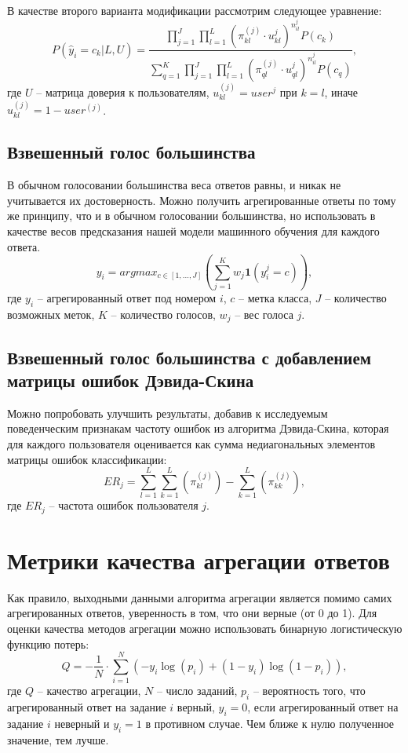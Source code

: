 \documentclass[specification,annotation,times]{itmo-student-thesis}
\begin{document}
В качестве второго варианта модификации рассмотрим следующее уравнение:
\[P(\hat{y}_{i}=c_{k}|L, U)=\frac{\prod_{j=1}^{J}\prod_{l=1}^{L}(\pi^{(j)}_{kl}\cdot u_{kl}^{j})^{n_{il}^{j}}P(c_{k})}{\sum_{q=1}^{K}\prod_{j=1}^{J}\prod_{l=1}^{L}(\pi^{(j)}_{ql}\cdot u_{ql}^{j})^{n_{il}^{j}}P(c_{q})},\]
где $U$ -- матрица доверия к пользователям, $u_{kl}^{(j)} = user^{j}$ при $k=l$, иначе $u_{kl}^{(j)} = 1 - user^{(j)}$.

\subsection{Взвешенный голос большинства}
В обычном голосовании большинства веса ответов равны, и никак не учитывается их достоверность. Можно получить агрегированные ответы по тому же принципу, что и в обычном голосовании большинства, но использовать в качестве весов предсказания нашей модели машинного обучения для каждого ответа.
\[y_{i}=argmax_{c\in[1,\dots,J]}(\sum_{j=1}^{K}w_{j}\mathbf{1}(y_{i}^{j}=c)),\]
где $y_{i}$ -- агрегированный ответ под номером $i$, $c$ -- метка класса, $J$ -- количество возможных меток, $K$ -- количество голосов, $w_{j}$ -- вес голоса $j$.

\subsection{Взвешенный голос большинства с добавлением матрицы ошибок Дэвида-Скина}
Можно попробовать улучшить результаты, добавив к исследуемым поведенческим признакам частоту ошибок из алгоритма Дэвида-Скина, которая для каждого пользователя оценивается как сумма недиагональных элементов матрицы ошибок классификации:
\[ER_{j}=\sum_{l=1}^{L}\sum_{k=1}^{L}(\pi^{(j)}_{kl}) - \sum_{k=1}^{L}(\pi^{(j)}_{kk}),\]
где $ER_{j}$ -- частота ошибок пользователя $j$.

\section{Метрики качества агрегации ответов}
Как правило, выходными данными алгоритма агрегации является помимо самих агрегированных ответов, уверенность в том, что они верные (от 0 до 1). Для оценки качества методов агрегации можно использовать бинарную логистическую функцию потерь:
\[Q=-\frac{1}{N}\cdot\sum_{i=1}^{N}(-y_{i}\log(p_{i})+(1-y_{i})\log(1-p_{i})),\]
где $Q$ -- качество агрегации, $N$ -- число заданий, $p_{i}$ -- вероятность того, что агрегированный ответ на задание $i$ верный, $y_{i}=0$, если агрегированный ответ на задание $i$ неверный и $y_{i}=1$ в противном случае. Чем ближе к нулю полученное значение, тем лучше.
\end{document}
